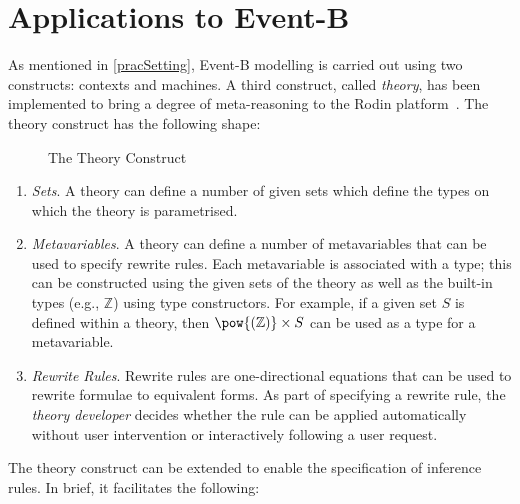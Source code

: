 \documentclass[copyright]{eptcs}
\begin{document}
\section{Applications to Event-B}\label{eapp}
As mentioned in \ref{pracSetting}, Event-B modelling is carried out using two constructs: contexts and machines. A third construct, called \textit{theory}, has been implemented to bring a degree of meta-reasoning to the Rodin platform~\cite{3056425}. The theory construct has the following shape:
\begin{figure}[ht]
\begin{center}
\end{center}
\caption{The Theory Construct}\label{thy}
\end{figure}
\begin{enumerate}
\item \textit{Sets}. A theory can define a number of given sets which define the types on which the theory is parametrised.
\item \textit{Metavariables}. A theory can define a number of metavariables that can be used to specify rewrite rules. Each metavariable is associated with a type; this can be constructed using the given sets of the theory as well as the built-in types (e.g., $\mathbb{Z}$) using type constructors. For example, if a given set $S$ is defined within a theory, then $\pow{\mathbb{(Z)}}\times S$ can be used as a type for a metavariable.
\item \textit{Rewrite Rules}. Rewrite rules are one-directional equations that can be used to rewrite formulae to equivalent forms. As part of specifying a rewrite rule, the \textit{theory developer} decides whether the rule can be applied automatically without user intervention or interactively following a user request.
\end{enumerate}
The theory construct can be extended to enable the specification of inference rules. In brief, it facilitates the following:
\end{document}

